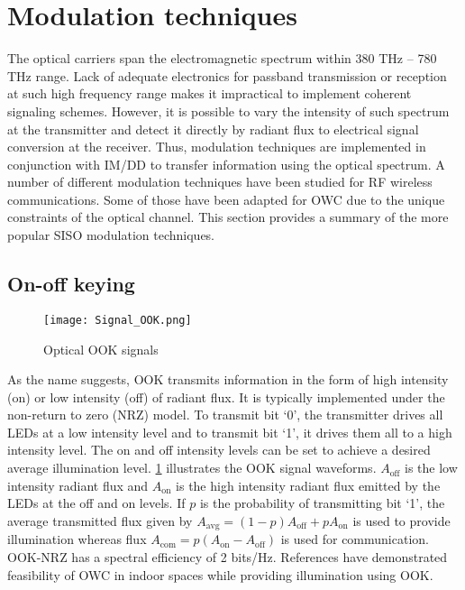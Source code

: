 \section{Modulation techniques}
\label{sec:sisoModulation}
\graphicspath{{_SISO/Figures/}}

The optical carriers span the electromagnetic spectrum within 380 THz -- 780 THz range. Lack of adequate electronics for passband transmission or reception at such high frequency range makes it impractical to implement coherent signaling schemes. However, it is possible to vary the intensity of such spectrum at the transmitter and detect it directly by radiant flux to electrical signal conversion at the receiver. Thus, modulation techniques are implemented in conjunction with IM/DD to transfer information using the optical spectrum. A number of different modulation techniques have been studied for RF wireless communications. Some of those have been adapted for OWC due to the unique constraints of the optical channel. This section provides a summary of the more popular SISO modulation techniques.

\subsection{On-off keying}
\label{subsec:sisoModulationOOK}
\begin{figure}[!b]
	\centering
		\texttt{[image: Signal\_OOK.png]}
		\caption{Optical OOK signals}
		\label{fig:sisoSigOOK}
\end{figure}
As the name suggests, OOK transmits information in the form of high intensity (on) or low intensity (off) of radiant flux. It is typically implemented under the non-return to zero (NRZ) model. To transmit bit `0', the transmitter drives all LEDs at a low intensity level and to transmit bit `1', it drives them all to a high intensity level. The on and off intensity levels can be set to achieve a desired average illumination level. \figurename{ \ref{fig:sisoSigOOK}} illustrates the OOK signal waveforms. $A_{\text{off}}$ is the low intensity radiant flux and $A_{\text{on}}$ is the high intensity radiant flux emitted by the LEDs at the off and on levels. If $p$ is the probability of transmitting bit `1', the average transmitted flux given by $A_{\text{avg}} = (1-p)A_{\text{off}} + pA_{\text{on}}$ is used to provide illumination whereas flux $A_{\text{com}} = p(A_{\text{on}}-A_{\text{off}})$ is used for communication. OOK-NRZ has a spectral efficiency of 2 bits/Hz. References \cite{kom04a,vuc09b} have demonstrated feasibility of OWC in indoor spaces while providing illumination using OOK.


